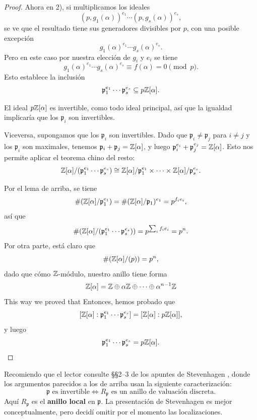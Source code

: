 \begin{teorema}
\begin{proof}
    Ahora en 2), si multiplicamos los ideales
    $$(p, g_1 (\alpha))^{e_1}\cdots (p, g_s (\alpha))^{e_s},$$
    se ve que el resultado tiene sus generadores divisibles por $p$, con una
    posible excepción
    $$g_1 (\alpha)^{e_1}\cdots g_s (\alpha)^{e_s}.$$
    Pero en este caso por nuestra elección de $g_i$ y $e_i$ se tiene
    $$g_1 (\alpha)^{e_1}\cdots g_s (\alpha)^{e_s} \equiv f (\alpha) = 0 \pmod{p}.$$
    Esto establece la inclusión
    \[ \mathfrak{p}_1^{e_1} \cdots \mathfrak{p}_s^{e_s} \subseteq p \mathbb{Z} [\alpha]. \]

    El ideal $p \mathbb{Z}[\alpha]$ es invertible, como todo ideal principal, así que
    la igualdad implicaría que los $\mathfrak{p}_i$ son invertibles.

    Viceversa, supongamos que los $\mathfrak{p}_i$ son invertibles. Dado que
    $\mathfrak{p}_i \ne \mathfrak{p}_j$ para $i\ne j$ y los $\mathfrak{p}_i$ son
    maximales, tenemos $\mathfrak{p}_i + \mathfrak{p}_j = \mathbb{Z} [\alpha]$,
    y luego $\mathfrak{p}_i^{e_i} + \mathfrak{p}_j^{e_j} = \mathbb{Z} [\alpha]$.
    Esto nos permite aplicar el teorema chino del resto:
    \[ \mathbb{Z}[\alpha]/(\mathfrak{p}_1^{e_1} \cdots \mathfrak{p}_s^{e_s}) \cong
         \mathbb{Z}[\alpha]/\mathfrak{p}_1^{e_1} \times \cdots \times
           \mathbb{Z}[\alpha]/\mathfrak{p}_s^{e_s}. \]

    Por el lema de arriba, se tiene
    \[ \# (\mathbb{Z}[\alpha]/\mathfrak{p}_1^{e_1}) =
       \#(\mathbb{Z}[\alpha]/\mathfrak{p}_1)^{e_1} = p^{f_i e_i}, \]
    así que
    \[ \# (\mathbb{Z} [\alpha] / (\mathfrak{p}_1^{e_1} \cdots \mathfrak{p}_s^{e_s})) =
       p^{\sum_i f_i e_i} = p^n. \]
    Por otra parte, está claro que
    $$\# (\mathbb{Z} [\alpha] / (p)) = p^n,$$
    dado que cómo $\mathbb{Z}$-módulo, nuestro anillo tiene forma
    $$\mathbb{Z} [\alpha] = \mathbb{Z} \oplus \alpha \mathbb{Z} \oplus \cdots \oplus \alpha^{n-1} \mathbb{Z}$$
    This way we proved that
    Entonces, hemos probado que
    \[ [\mathbb{Z} [\alpha] : \mathfrak{p}_1^{e_1} \cdots \mathfrak{p}_s^{e_s}] =
       [\mathbb{Z} [\alpha] : p \mathbb{Z} [\alpha]], \]
    y luego
    \[ \mathfrak{p}_1^{e_1} \cdots \mathfrak{p}_s^{e_s} = p \mathbb{Z} [\alpha]. \qedhere \]
  \end{proof}
\end{teorema}

\begin{comentario}
  Recomiendo que el lector consulte \S\S 2--3 de los apuntes de Stevenhagen
  \cite{Stevenhagen-NR}, donde los argumentos parecidos a los de arriba usan
  la siguiente caracterización:
  \[ \mathfrak{p}\text{ es invertible} \iff
     R_\mathfrak{p}\text{ es un anillo de valuación discreta}. \]
  Aquí $R_\mathfrak{p}$ es el \textbf{anillo local} en $\mathfrak{p}$.
  La presentación de Stevenhagen es mejor conceptualmente, pero decidí omitir
  por el momento las localizaciones.
\end{comentario}

